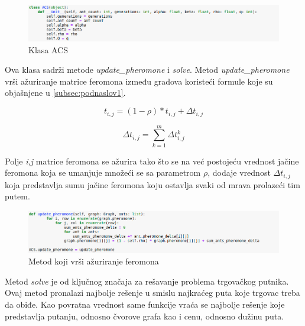 \documentclass[a4paper]{article}
\begin{document}
{\begin{itemize}
\end{itemize}


\begin{figure}[h!]
\begin{center}
\includegraphics[width=1\columnwidth]{slika2.png}
\end{center}
\caption{Klasa ACS}
\label{fig:slika2}
\end{figure}


Ova klasa sadrži metode \textit{update\_pheromone} i \textit{solve}.
Metod \textit{update\_pheromone} vrši ažuriranje matrice feromona između gradova koristeći formule koje su objašnjene u \ref{subsec:podnaslov1}.


\begin{equation}
t_{i,j} = (1-\rho) * t_{i,j} + \Delta t_{i,j}
\end{equation}

\begin{equation}
\Delta t_{i,j}  = \sum_{k=1}^{m} \Delta t^k_{i,j}
\end{equation}

Polje \textit{i,j} matrice feromona se ažurira tako što se na već postojeću vrednost jačine feromona koja se umanjuje množeći se sa parametrom $\rho$, dodaje vrednost $\Delta t_{i,j}$ koja predstavlja sumu jačine feromona koju ostavlja svaki od mrava prolazeći tim putem.

\begin{figure}[h!]
\begin{center}
\includegraphics[width=1\columnwidth]{slika3.png}
\end{center}
\caption{Metod koji vrši ažuriranje feromona}
\label{fig:slika3}
\end{figure}


Metod \textit{solve} je od ključnog značaja za rešavanje problema trgovačkog putnika. Ovaj metod pronalazi najbolje rešenje u smislu najkraćeg puta koje trgovac treba da obiđe. Kao povratna vrednost same funkcije vraća se najbolje rešenje koje predstavlja putanju, odnosno čvorove grafa kao i cenu, odnosno dužinu puta. 

}
\end{document}
